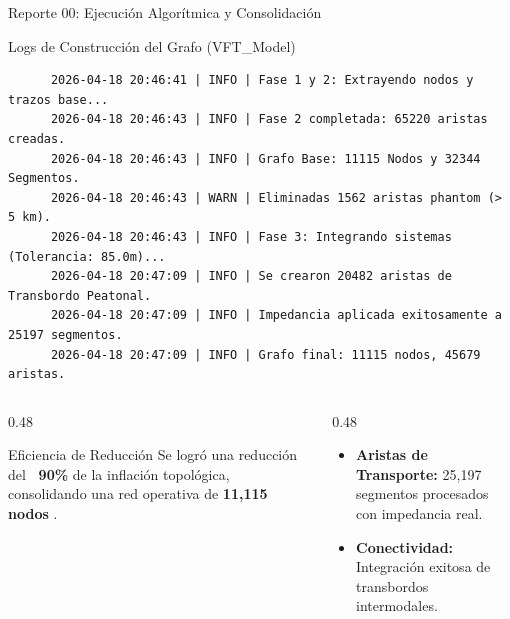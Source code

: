 \begin{frame}[fragile]{Reporte 00: Ejecución Algorítmica y Consolidación}
  \begin{block}{Logs de Construcción del Grafo (VFT\_Model)}
    \fontsize{7pt}{8pt}\selectfont
    \begin{verbatim}
      2026-04-18 20:46:41 | INFO | Fase 1 y 2: Extrayendo nodos y trazos base...
      2026-04-18 20:46:43 | INFO | Fase 2 completada: 65220 aristas creadas.
      2026-04-18 20:46:43 | INFO | Grafo Base: 11115 Nodos y 32344 Segmentos.
      2026-04-18 20:46:43 | WARN | Eliminadas 1562 aristas phantom (> 5 km).
      2026-04-18 20:46:43 | INFO | Fase 3: Integrando sistemas (Tolerancia: 85.0m)...
      2026-04-18 20:47:09 | INFO | Se crearon 20482 aristas de Transbordo Peatonal.
      2026-04-18 20:47:09 | INFO | Impedancia aplicada exitosamente a 25197 segmentos.
      2026-04-18 20:47:09 | INFO | Grafo final: 11115 nodos, 45679 aristas.
    \end{verbatim}
  \end{block}

  \begin{columns}[T]
    \begin{column}{0.48\textwidth}
      \begin{exampleblock}{Eficiencia de Reducción}
        Se logró una reducción del \textbf{~90\%} de la inflación topológica, consolidando una red operativa de \textbf{11,115 nodos} \cite{Garibaldi2024VFT}.
      \end{exampleblock}
    \end{column}
    \begin{column}{0.48\textwidth}
      \begin{itemize}
        \item \textbf{Aristas de Transporte:} 25,197 segmentos procesados con impedancia real.
        \item \textbf{Conectividad:} Integración exitosa de transbordos intermodales.
      \end{itemize}
    \end{column}
  \end{columns}
\end{frame}

